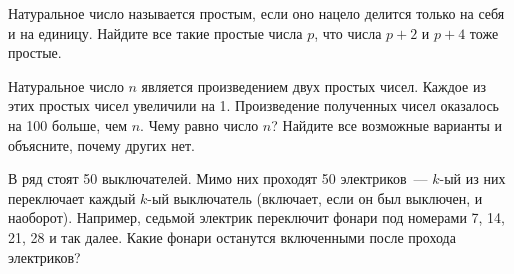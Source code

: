 ﻿
\begin{itemize}

\itA Натуральное число называется простым, если оно нацело делится только на себя и на единицу. Найдите все такие простые числа $p$, что числа $p+2$ и $p+4$ тоже простые.

\itB Натуральное число $n$ является произведением двух простых чисел. Каждое из этих простых чисел увеличили на 1. Произведение полученных чисел оказалось на 100 больше, чем $n$. Чему равно число $n$? Найдите все возможные варианты и объясните, почему других нет.

\itC В ряд стоят 50 выключателей. Мимо них проходят 50 электриков~— $k$-ый из них переключает каждый $k$-ый выключатель (включает, если он был выключен, и наоборот). Например, седьмой электрик переключит фонари под номерами 7, 14, 21, 28 и так далее. Какие фонари останутся включенными после прохода электриков?
\end{itemize}
